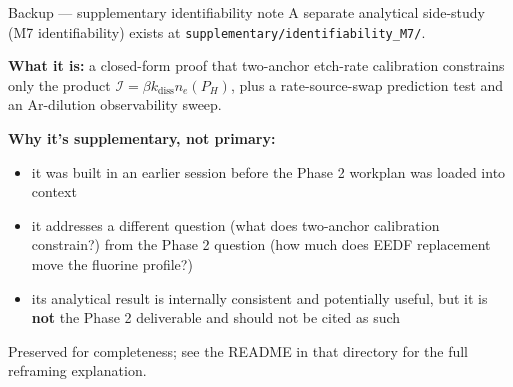 \documentclass[10pt,aspectratio=169]{beamer}
\newcommand{\kdiss}{k_{\mathrm{diss}}}
\begin{document}
\begin{frame}{Backup --- supplementary identifiability note}
  \small
  A separate analytical side-study (M7 identifiability) exists
  at \texttt{supplementary/identifiability\_M7/}.

  \vspace{0.4em}
  \textbf{What it is:} a closed-form proof that two-anchor etch-rate
  calibration constrains only the product
  $\mathcal{I} = \beta \kdiss n_e(P_H)$, plus a rate-source-swap
  prediction test and an Ar-dilution observability sweep.

  \vspace{0.4em}
  \textbf{Why it's supplementary, not primary:}
  \begin{itemize}\small
    \item it was built in an earlier session before the Phase 2
          workplan was loaded into context
    \item it addresses a different question (what does two-anchor
          calibration constrain?) from the Phase 2 question (how
          much does EEDF replacement move the fluorine profile?)
    \item its analytical result is internally consistent and
          potentially useful, but it is \textbf{not} the Phase 2
          deliverable and should not be cited as such
  \end{itemize}

  \vspace{0.3em}
  Preserved for completeness; see the README in that directory
  for the full reframing explanation.
\end{frame}
\end{document}
